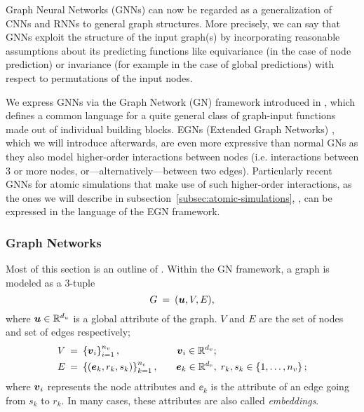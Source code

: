

Graph Neural 
Networks (GNNs) can now be regarded as a generalization of CNNs and RNNs to general graph structures.
More precisely, we can say that GNNs exploit the structure of the input graph(s) by incorporating
reasonable assumptions about its predicting functions like equivariance (in the case of node prediction) or invariance (for example in the case of global predictions) with respect to permutations of the 
input nodes.

We express GNNs via the Graph Network (GN) framework introduced in 
\cite{https://doi.org/10.48550/arxiv.1806.01261}, which defines
a common language for a quite general class of graph-input functions made out of 
individual building blocks. EGNs (Extended Graph Networks) \cite{https://doi.org/10.48550/arxiv.2203.09697}, which we will 
introduce afterwards, are even more expressive than normal 
GNs as they also model higher-order interactions between nodes (i.e. interactions 
between 3 or more nodes, or---alternatively---between two edges). Particularly recent 
GNNs for atomic simulations that make use of such higher-order interactions, as the ones we will describe 
in subsection~\ref{subsec:atomic-simulations}, \cite*{DBLP:journals/corr/abs-2003-03123,https://doi.org/10.48550/arxiv.2106.08903}, 
can be expressed in the language of the EGN framework.

\subsubsection{Graph Networks}
\label{subsubsec:gns}

Most of this section is an outline of \cite[Section 3.2]{https://doi.org/10.48550/arxiv.1806.01261}. 
Within the GN framework, a graph is modeled as a 3-tuple
\[ G \: = \: (\boldsymbol{u}, V, E) \text{,} \]
where $\boldsymbol{u} \in \mathbb{R}^{d_u}$ is a global attribute of the graph. $V$ and $E$ are the set of nodes and
set of edges respectively;
\begin{align*}
    V \: &= \: \left\{\boldsymbol{v}_i\right\}_{i=1}^{n_v},             &\quad \boldsymbol{v}_i \in \mathbb{R}^{d_v}&; \\
    E \: &= \: \left\{(\boldsymbol{e}_k, r_k, s_k)\right\}_{k=1}^{n_e}, &\quad \boldsymbol{e}_k \in \mathbb{R}^{d_e}&, \; r_k, s_k \in \left\{1, \dots, n_v\right\};
\end{align*}
where $\boldsymbol{v}_i$ represents the node attributes and $\ee_k$ is the attribute of an edge
going from $s_k$ to $r_k$. In many cases, these attributes are also called \textit{embeddings}.

